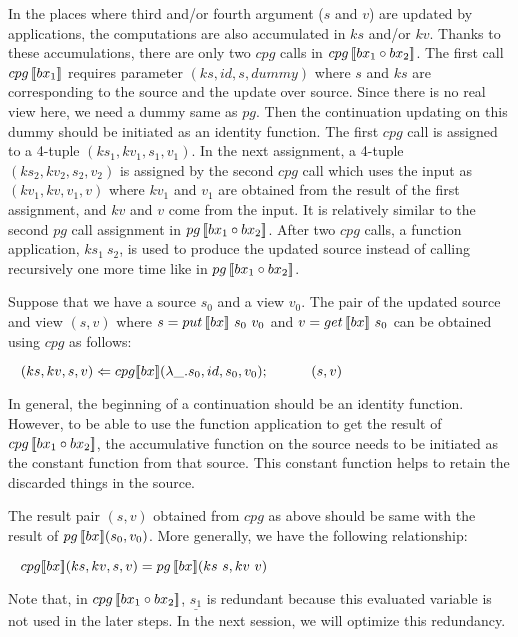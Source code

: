 In the places where third and/or fourth argument ($s$ and $v$) are updated by applications, the computations are also accumulated in $ks$ and/or $kv$.
Thanks to these accumulations, there are only two $cpg$ calls in $cpg \, [\![bx_1 \circ bx_2]\!]$. The first call $cpg \, [\![bx_1]\!]$ requires parameter $(ks, id, s, dummy)$ where $s$ and $ks$ are corresponding to the source and the update over source. Since there is no real view here, we need a dummy same as $pg$. Then the continuation updating on this dummy should be initiated as an identity function. The first $cpg$ call is assigned to a 4-tuple $(ks_1, kv_1, s_1, v_1)$. In the next assignment, a 4-tuple $(ks_2, kv_2, s_2, v_2)$ is assigned by the second $cpg$ call which uses the input as $(kv_1, kv, v_1, v)$ where $kv_1$ and $v_1$ are obtained from the result of the first assignment, and $kv$ and $v$ come from the input. It is relatively similar to the second $pg$ call assignment in $pg \, [\![bx_1 \circ bx_2]\!]$. After two $cpg$ calls, a function application, $ks_1 \ s_2$, is used to produce the updated source instead of calling recursively one more time like in $pg \, [\![bx_1 \circ bx_2]\!]$.

Suppose that we have a source $s_0$ and a view $v_0$. The pair of the updated source and view $(s, v)$ where $s = put \, [\![bx]\!] \ s_0 \ v_0$ and $v = get \, [\![bx]\!] \ s_0$ can be obtained using $cpg$ as follows:

\smallvspace
    $\tab (ks, kv, s, v) \Leftarrow \cpg{bx}{\lambda \_.s_0}{id}{s_0}{v_0};\\
        \tab \qtab (s, v)$
\smallvspace
        
In general, the beginning of a continuation should be an identity function. However, to be able to use the function application to get the result of $cpg \, [\![bx_1 \circ bx_2]\!]$, the accumulative function on the source needs to be initiated as the constant function from that source. This constant function helps to retain the discarded things in the source.

The result pair $(s, v)$ obtained from $cpg$ as above should be same with the result of $pg \, [\![bx]\!] (s_0, v_0)$. More generally, we have the following relationship:

$\tab \cpg{bx}{ks}{kv}{s}{v} = \pg{bx}{ks \ s}{kv \ v}$

Note that, in $cpg \, [\![bx_1 \circ bx_2]\!]$, $\underline{s_1}$ is redundant because this evaluated variable is not used in the later steps.
In the next session, we will optimize this redundancy.

